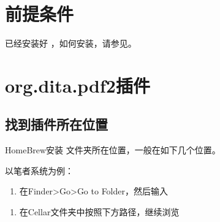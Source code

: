 \documentclass[letterpaper,10pt,english]{sphinxmanual}
\begin{document}
\section{前提条件}
\label{\detokenize{formatting/dita_plugin-dev:id1}}
\sphinxAtStartPar
已经安装好 	，如何安装，请参见。


\section{org.dita.pdf2插件}
\label{\detokenize{formatting/dita_plugin-dev:org-dita-pdf2}}

\subsection{找到插件所在位置}
\label{\detokenize{formatting/dita_plugin-dev:id2}}
\sphinxAtStartPar
HomeBrew安装 文件夹所在位置，一般在如下几个位置。

\begin{sphinxVerbatim}[commandchars=\\\{\}]
\end{sphinxVerbatim}

\sphinxAtStartPar
以笔者系统为例：
\begin{enumerate}
%
\item {} 
\sphinxAtStartPar
在Finder\sphinxhyphen{}>Go\sphinxhyphen{}>Go to Folder，然后输入

\end{enumerate}

\begin{sphinxVerbatim}[commandchars=\\\{\}]
\end{sphinxVerbatim}
\begin{enumerate}
%
\setcounter{enumi}{1}
\item {} 
\sphinxAtStartPar
在Cellar文件夹中按照下方路径，继续浏览

\end{enumerate}
\end{document}
